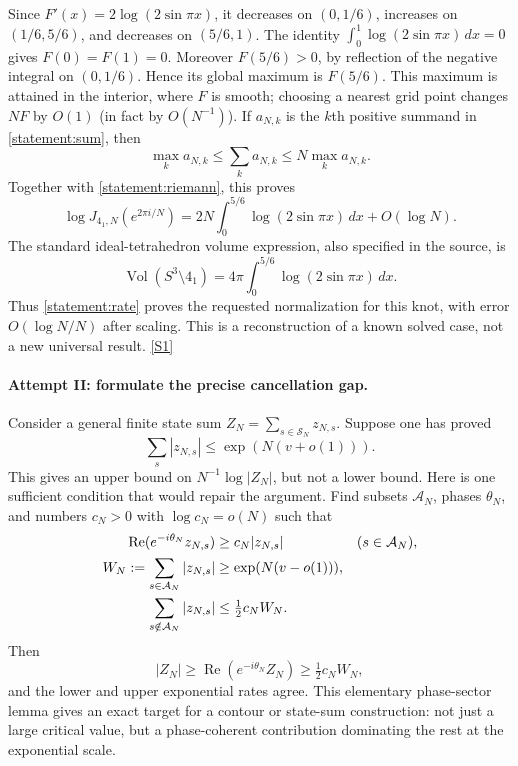 \documentclass[11pt,a4paper]{article}
\newcommand{\sref}[2]{\hyperlink{source:#1:#2}{[S#2]}}
\numberwithin{equation}{section}
\begin{document}
Since $F'(x)=2\log(2\sin\pi x)$, it decreases on $(0,1/6)$,
increases on $(1/6,5/6)$, and decreases on $(5/6,1)$.
The identity $\int_0^1\log(2\sin\pi x)\,dx=0$ gives
$F(0)=F(1)=0$.  Moreover $F(5/6)>0$, by reflection of the negative
integral on $(0,1/6)$.  Hence its global maximum is $F(5/6)$.
This maximum is attained in the interior, where $F$ is smooth; choosing
a nearest grid point changes $NF$ by $O(1)$ (in fact by $O(N^{-1})$).
If $a_{N,k}$ is the $k$th positive summand in \eqref{statement:sum}, then
\[
 \max_k a_{N,k}\leq\sum_k a_{N,k}\leq N\max_k a_{N,k}.
\]
Together with \eqref{statement:riemann}, this proves
\begin{equation}\label{statement:rate}
 \log J_{4_1,N}(e^{2\pi i/N})
 =2N\int_0^{5/6}\log(2\sin\pi x)\,dx+O(\log N).
\end{equation}
The standard ideal-tetrahedron volume expression, also specified in the
source, is
\[
 \operatorname{Vol}(S^3\setminus4_1)
 =4\pi\int_0^{5/6}\log(2\sin\pi x)\,dx.
\]
Thus \eqref{statement:rate} proves the requested normalization for this knot,
with error $O(\log N/N)$ after scaling.  This is a reconstruction of a
known solved case, not a new universal result. \sref{statement}{1}

\paragraph{Attempt II: formulate the precise cancellation gap.}
Consider a general finite state sum $Z_N=\sum_{s\in\mathcal S_N}z_{N,s}$.
Suppose one has proved
\[
 \sum_s|z_{N,s}|\leq\exp(N(v+o(1))).
\]
This gives an upper bound on $N^{-1}\log|Z_N|$, but not a lower bound.
Here is one sufficient condition that would repair the argument.  Find
subsets $\mathcal A_N$, phases $\theta_N$, and numbers $c_N>0$ with
$\log c_N=o(N)$ such that
\begin{align}\label{statement:phase}
 \operatorname{Re}(e^{-i\theta_N}z_{N,s})&\geq c_N|z_{N,s}|
                 &&(s\in\mathcal A_N),\\
 W_N:=\sum_{s\in\mathcal A_N}|z_{N,s}|&\geq\exp(N(v-o(1))),\notag\\
 \sum_{s\notin\mathcal A_N}|z_{N,s}|&\leq\tfrac12c_NW_N.\notag
\end{align}
Then
\[
 |Z_N|\geq\operatorname{Re}(e^{-i\theta_N}Z_N)
       \geq\tfrac12c_NW_N,
\]
and the lower and upper exponential rates agree.  This elementary
phase-sector lemma gives an exact target for a contour or state-sum
construction: not just a large critical value, but a phase-coherent
contribution dominating the rest at the exponential scale.
\end{document}
